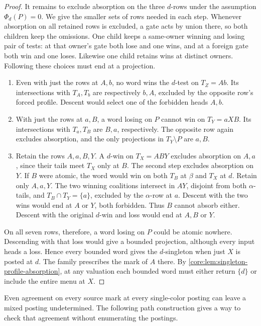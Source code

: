 \begin{proof}
It remains to exclude absorption on the three $d$-rows under the
assumption $\Phi_d(P)=0$. We give the smaller sets of rows needed
in each step. Whenever absorption on all retained rows is excluded,
a gate acts by union there, so both children keep the omissions.
One child keeps a same-owner winning and losing pair of tests:
at that owner's gate both lose and one wins, and at a foreign gate
both win and one loses. Likewise one child retains wins at distinct
owners. Following these choices must end at a projection.
\begin{enumerate}
\item Even with just the rows at $A,b$, no word wins the $d$-test on
$T_Z=Ab$. Its intersections with $T_A,T_b$ are respectively $b,A$,
excluded by the opposite row's forced profile. Descent would select
one of the forbidden heads $A,b$.
\item With just the rows at $a,B$, a word losing on $P$ cannot win
on $T_Y=aXB$. Its intersections with $T_a,T_B$ are $B,a$,
respectively. The opposite row again excludes absorption, and the
only projections in $T_Y\setminus P$ are $a,B$.
\item Retain the rows $A,a,B,Y$. A $d$-win on $T_X=ABY$ excludes
absorption on $A,a$, since their tails meet $T_X$ only at $B$.
The second step excludes absorption on $Y$. If $B$ were atomic,
the word would win on both $T_B$ at $\beta$ and $T_X$ at $d$.
Retain only $A,a,Y$. The two winning coalitions intersect in $AY$,
disjoint from both $\alpha$-tails, and $T_B\cap T_Y=\{a\}$, excluded
by the $\alpha$-row at $a$. Descent with the two wins would end at
$A$ or $Y$, both forbidden. Thus $B$ cannot absorb either. Descent
with the original $d$-win and loss would end at $A,B$ or $Y$.
\end{enumerate}
On all seven rows, therefore, a word losing on $P$ could be atomic
nowhere. Descending with that loss would give a bounded projection,
although every input heads a loss. Hence every bounded word gives
the $d$-singleton when just $X$ is posted at $d$. The family
prescribes the mark of $A$ there. By \cref{core:lem:singleton-profile-absorption},
at any valuation each bounded word must either return $\{d\}$ or
include the entire menu at $X$.
\end{proof}

Even agreement on every source mark at every single-color posting
can leave a mixed posting undetermined. The following path construction
gives a way to check that agreement without enumerating the postings.


